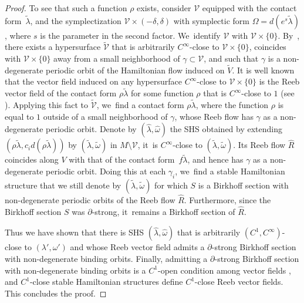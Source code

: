 \documentclass[JEP,XML,SOM,Unicode,NoEqCountersInSection,NoFloatCountersInSection,published]{cedram}
\theoremstyle{definition}
\begin{document}
\begin{proof}
To see that such a function $\rho$ exists, consider $\mathcal V$ equipped with the contact form~$\widetilde\lambda$, and the symplectization $\mathcal V\times (-\delta,\delta)$ with symplectic form $\Omega= d(e^s\widetilde\lambda)$, where $s$ is the parameter in the second factor. We~identify $\mathcal V$ with $\mathcal V\times \{0\}$. By~\cite[Lem.\,19]{Ro}, there exists a hypersurface $\widetilde{\mathcal V}$ that is arbitrarily $C^\infty$-close to $\mathcal V\times \{0\}$, coincides with $\mathcal V\times \{0\}$ away from a small neighborhood of $\gamma\subset \mathcal V$, and such that $\gamma$ is a non-degenerate periodic orbit of the Hamiltonian flow induced on $\widetilde V$. It is well known that the vector field induced on any hypersurface $C^\infty$-close to $\mathcal V\times \{0\}$ is the Reeb vector field of the contact form $\rho \widetilde\lambda$ for some function $\rho$ that is $C^\infty$-close to $1$ (see \eg \cite[\S 6]{HWZ2}). Applying this fact to $\widetilde{\mathcal V}$, we~find a contact form $\rho \widetilde \lambda$, where the function $\rho$ is equal to $1$ outside of a small neighborhood of $\gamma$, whose Reeb flow has $\gamma$ as a non-degenerate periodic orbit. Denote by $(\hat \lambda, \hat \omega)$ the SHS obtained by extending $(\rho \widetilde \lambda, c_i d(\rho \widetilde \lambda))$ by $(\widetilde \lambda,\widetilde \omega)$ in $M\setminus \mathcal V$, it~is $C^\infty$-close to $(\widetilde \lambda,\widetilde \omega)$. Its Reeb flow $\hat R$ coincides along $V$ with that of the contact form~$f\widetilde \lambda$, and hence has $\gamma$ as a non-degenerate periodic orbit. Doing this at each $\gamma_i$, we~find a stable Hamiltonian structure that we still denote by $(\widetilde \lambda, \widetilde \omega)$ for which $S$ is a Birkhoff section with non-degenerate periodic orbits of the Reeb flow $\hat R$. Furthermore, since the Birkhoff section $S$ was $\partial$-strong, it~remains a Birkhoff section of $\hat R$.

Thus we have shown that there is SHS $(\hat \lambda,\hat \omega)$ that is arbitrarily $(C^1, C^\infty)$-close to $(\lambda',\omega')$ and whose Reeb vector field admits a $\partial$-strong Birkhoff section with non-degenerate binding orbits. Finally, admitting a $\partial$-strong Birkhoff section with non-degenerate binding orbits is a $C^1$-open condition among vector fields \cite[Prop.\,5.1]{CDHR}, and $C^1$-close stable Hamiltonian structures define $C^1$-close Reeb vector fields. This concludes the proof.
\end{proof}
\end{document}
